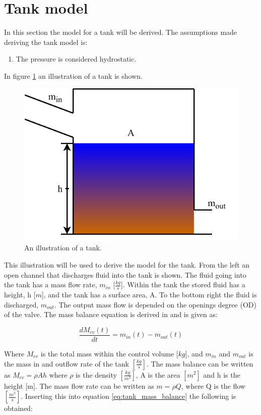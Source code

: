 \section{Tank model}\label{se:sewer_reservoir}
In this section the model for a tank will be derived. 
The assumptions made deriving the tank model is:
\begin{table}[H]
\begin{enumerate}
\item The pressure is considered hydrostatic.
\end{enumerate}
\end{table}

In figure \ref{fig:tank_model} an illustration of a tank is shown.
\begin{figure}[H]
\centering
\includegraphics[width=.6\textwidth]{report/modeling/pictures/reservior.pdf}
\caption{An illustration of a tank.}
\label{fig:tank_model}
\end{figure} 

This illustration will be used to derive the model for the tank. From the left an open channel that discharges fluid into the tank is shown. The fluid going into the tank has a mass flow rate, $m_{in}$ [$\frac{kg}{s}$]. Within the tank the stored fluid has a height, h [$m$], and the tank has a surface area, A. To the bottom right the fluid is discharged, $m_{out}$. The output mass flow is depended on the openings degree (OD) of the valve. The mass balance equation is derived in \cite{model_tank} and is given as:


\begin{equation}
	 	\frac{dM_{cv}(t)}{dt}=m_{in}(t)-m_{o ut}(t)
\label{eq:tank_mass_balance}
\end{equation} 

Where $M_{cv}$ is the total mass within the control volume [$kg$], and $m_{in}$ and $m_{out}$ is the mass in and outflow rate of the tank $\left[\frac{kg}{s}\right]$. The mass balance can be written as $M_{cv} = \rho Ah$ where $\rho$ is the density $\left[\frac{kg}{m^3}\right]$, A is the area $\left[m^2\right]$ and h is the height [m]. The mass flow rate can be written as $m = \rho Q$, where Q is the flow $\left[\frac{m^3}{s}\right]$. Inserting this into equation \ref{eq:tank_mass_balance} the following is obtained:

